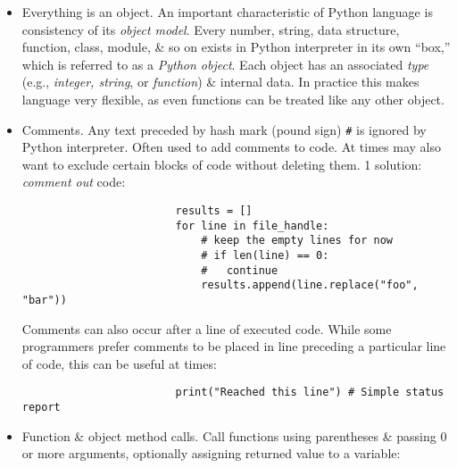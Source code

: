 \documentclass{article}
\newtheorem{remark}{Remark}
\begin{document}
\begin{enumerate}
\begin{itemize}
\begin{itemize}
\begin{itemize}
\begin{itemize}
					Love it or hate it, significant whitespace is a fact of life for Python programmers. While it may seem foreign at 1st, will hopefully grow accustomed to it in time.
					\begin{remark}
						Strong recommend using \emph{4 spaces} as your default indentation \& replacing tabs with 4 spaces. Many text editors have a setting that will replace tab stops with spaces automatically insert 4 spaces on new lines following a colon \& replace tabs by 4 spaces.
					\end{remark}
					As you can see by now, Python statements also do not need to be terminated by semicolons. Semicolons can be used, however, to separate multiple statements on a single line:
					\begin{verbatim}
						a = 5; b = 6; c = 7
					\end{verbatim}
					Putting multiple statements on 1 line is generally discouraged in Python as it can make code less readable.
					\item {\sf Everything is an object.} An important characteristic of Python language is consistency of its {\it object model}. Every number, string, data structure, function, class, module, \& so on exists in Python interpreter in its own ``box,'' which is referred to as a {\it Python object}. Each object has an associated {\it type} (e.g., {\it integer, string}, or {\it function}) \& internal data. In practice this makes language very flexible, as even functions can be treated like any other object.
					\item {\sf Comments.} Any text preceded by hash mark (pound sign) \verb|#| is ignored by Python interpreter. Often used to add comments to code. At times may also want to exclude certain blocks of code without deleting them. 1 solution: {\it comment out} code:
					\begin{verbatim}
						results = []
						for line in file_handle:
						    # keep the empty lines for now
						    # if len(line) == 0:
						    #   continue
						    results.append(line.replace("foo", "bar"))
					\end{verbatim}
					Comments can also occur after a line of executed code. While some programmers prefer comments to be placed in line preceding a particular line of code, this can be useful at times:
					\begin{verbatim}
						print("Reached this line") # Simple status report
					\end{verbatim}
					\item {\sf Function \& object method calls.} Call functions using parentheses \& passing 0 or more arguments, optionally assigning returned value to a variable:

\end{itemize}
\end{itemize}
\end{itemize}
\end{itemize}
\end{enumerate}
\end{document}
